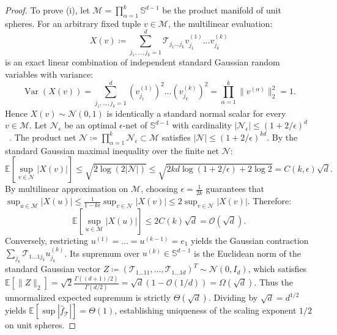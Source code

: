 \documentclass[11pt,a4paper,reqno]{amsart}
\theoremstyle{definition}
\numberwithin{equation}{section}
\providecommand{\Sph}{\mathbb{S}}
\begin{document}
\begin{proof}
To prove (i), let $\mathcal{M} = \prod_{\alpha=1}^k \Sph^{d-1}$ be the product manifold of unit spheres. For an arbitrary fixed tuple $v \in \mathcal{M}$, the multilinear evaluation:
\begin{equation}
    X(v) \coloneqq \sum_{j_1, \dots, j_k = 1}^d \mathcal{T}_{j_1 \dots j_k} v_{j_1}^{(1)} \dots v_{j_k}^{(k)}
\end{equation}
is an exact linear combination of independent standard Gaussian random variables with variance:
\begin{equation}
    \operatorname{Var}(X(v)) = \sum_{j_1, \dots, j_k = 1}^d (v_{j_1}^{(1)})^2 \dots (v_{j_k}^{(k)})^2 = \prod_{\alpha=1}^k \|v^{(\alpha)}\|_2^2 = 1.
\end{equation}
Hence $X(v) \sim \mathcal{N}(0, 1)$ is identically a standard normal scalar for every $v \in \mathcal{M}$. Let $\mathcal{N}_\epsilon$ be an optimal $\epsilon$-net of $\Sph^{d-1}$ with cardinality $|\mathcal{N}_\epsilon| \le (1 + 2/\epsilon)^d$~\cite[\S 4.2]{vershynin2018}. The product net $\mathcal{N} \coloneqq \prod_{\alpha=1}^k \mathcal{N}_\epsilon \subset \mathcal{M}$ satisfies $|\mathcal{N}| \le (1 + 2/\epsilon)^{k d}$. By the standard Gaussian maximal inequality over the finite net $\mathcal{N}$:
\begin{equation}
    \mathbb{E}\left[ \sup_{v \in \mathcal{N}} |X(v)| \right] \le \sqrt{2 \log(2 |\mathcal{N}|)} \le \sqrt{2 k d \log(1 + 2/\epsilon) + 2\log 2} = C(k, \epsilon) \sqrt{d}.
\end{equation}
By multilinear approximation on $\mathcal{M}$, choosing $\epsilon = \frac{1}{2k}$ guarantees that $\sup_{u \in \mathcal{M}} |X(u)| \le \frac{1}{1 - k\epsilon} \sup_{v \in \mathcal{N}} |X(v)| \le 2 \sup_{v \in \mathcal{N}} |X(v)|$. Therefore:
\begin{equation}
    \mathbb{E}\left[ \sup_{u \in \mathcal{M}} |X(u)| \right] \le 2 C(k) \sqrt{d} = \mathcal{O}(\sqrt{d}).
\end{equation}
Conversely, restricting $u^{(1)} = \dots = u^{(k-1)} = e_1$ yields the Gaussian contraction $\sum_{j_k} \mathcal{T}_{1 \dots 1 j_k} u_{j_k}^{(k)}$. Its supremum over $u^{(k)} \in \Sph^{d-1}$ is the Euclidean norm of the standard Gaussian vector $Z \coloneqq (\mathcal{T}_{1 \dots 1 1}, \dots, \mathcal{T}_{1 \dots 1 d})^T \sim \mathcal{N}(0, I_d)$, which satisfies $\mathbb{E}[\|Z\|_2] = \sqrt{2} \frac{\Gamma((d+1)/2)}{\Gamma(d/2)} = \sqrt{d}(1 - \mathcal{O}(1/d)) = \Omega(\sqrt{d})$. Thus the unnormalized expected supremum is strictly $\Theta(\sqrt{d})$. Dividing by $\sqrt{d} = d^{1/2}$ yields $\mathbb{E}[\sup |\widehat{f}_{\mathcal{T}}|] = \Theta(1)$, establishing uniqueness of the scaling exponent $1/2$ on unit spheres.


\end{proof}
\end{document}
